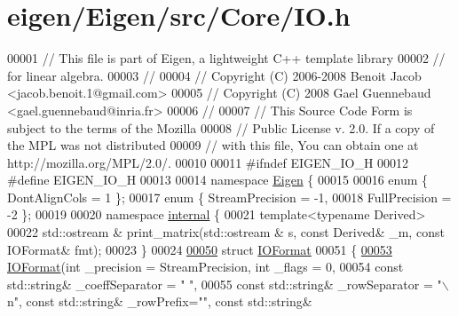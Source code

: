 \hypertarget{eigen_2_eigen_2src_2_core_2_i_o_8h_source}{}\section{eigen/\+Eigen/src/\+Core/\+IO.h}
\label{eigen_2_eigen_2src_2_core_2_i_o_8h_source}

\begin{DoxyCode}
00001 \textcolor{comment}{// This file is part of Eigen, a lightweight C++ template library}
00002 \textcolor{comment}{// for linear algebra.}
00003 \textcolor{comment}{//}
00004 \textcolor{comment}{// Copyright (C) 2006-2008 Benoit Jacob <jacob.benoit.1@gmail.com>}
00005 \textcolor{comment}{// Copyright (C) 2008 Gael Guennebaud <gael.guennebaud@inria.fr>}
00006 \textcolor{comment}{//}
00007 \textcolor{comment}{// This Source Code Form is subject to the terms of the Mozilla}
00008 \textcolor{comment}{// Public License v. 2.0. If a copy of the MPL was not distributed}
00009 \textcolor{comment}{// with this file, You can obtain one at http://mozilla.org/MPL/2.0/.}
00010 
00011 \textcolor{preprocessor}{#ifndef EIGEN\_IO\_H}
00012 \textcolor{preprocessor}{#define EIGEN\_IO\_H}
00013 
00014 \textcolor{keyword}{namespace }\hyperlink{namespace_eigen}{Eigen} \{ 
00015 
00016 \textcolor{keyword}{enum} \{ DontAlignCols = 1 \};
00017 \textcolor{keyword}{enum} \{ StreamPrecision = -1,
00018        FullPrecision = -2 \};
00019 
00020 \textcolor{keyword}{namespace }\hyperlink{namespaceinternal}{internal} \{
00021 \textcolor{keyword}{template}<\textcolor{keyword}{typename} Derived>
00022 std::ostream & print\_matrix(std::ostream & s, \textcolor{keyword}{const} Derived& \_m, \textcolor{keyword}{const} IOFormat& fmt);
00023 \}
00024 
\hyperlink{group___core___module}{00050} \textcolor{keyword}{struct }\hyperlink{group___core___module_struct_eigen_1_1_i_o_format}{IOFormat}
00051 \{
\hyperlink{group___core___module_a637b0b62f49a87c1396a904de46c4856}{00053}   \hyperlink{group___core___module_a637b0b62f49a87c1396a904de46c4856}{IOFormat}(\textcolor{keywordtype}{int} \_precision = StreamPrecision, \textcolor{keywordtype}{int} \_flags = 0,
00054     \textcolor{keyword}{const} std::string& \_coeffSeparator = \textcolor{stringliteral}{" "},
00055     \textcolor{keyword}{const} std::string& \_rowSeparator = \textcolor{stringliteral}{"\(\backslash\)n"}, \textcolor{keyword}{const} std::string& \_rowPrefix=\textcolor{stringliteral}{""}, \textcolor{keyword}{const} std::string& 

\end{DoxyCode}
